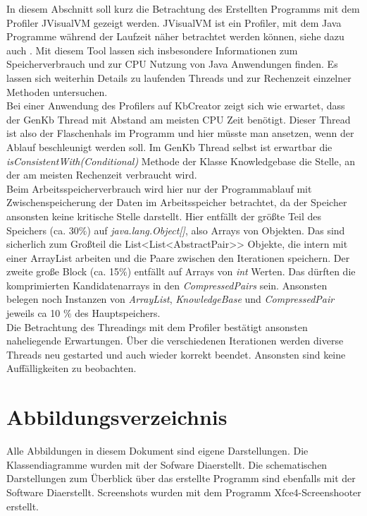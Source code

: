 \documentclass[12pt,a4paper]{article}
\begin{document}
In diesem Abschnitt soll kurz die Betrachtung des Erstellten Programms mit dem Profiler JVisualVM gezeigt werden. JVisualVM ist ein Profiler, mit dem Java Programme während der Laufzeit näher betrachtet werden können, siehe dazu auch \cite{jvis20}. Mit diesem Tool lassen sich insbesondere Informationen zum Speicherverbrauch und zur CPU Nutzung von Java Anwendungen finden. Es lassen sich weiterhin Details zu laufenden Threads und zur Rechenzeit einzelner Methoden untersuchen. \\
Bei einer Anwendung des Profilers auf KbCreator zeigt sich wie erwartet, dass der GenKb Thread mit Abstand am meisten CPU Zeit benötigt. Dieser Thread ist also der Flaschenhals im Programm und hier müsste man ansetzen, wenn der Ablauf beschleunigt werden soll. Im GenKb Thread selbst ist erwartbar die \textit{isConsistentWith(Conditional)} Methode der Klasse Knowledgebase die Stelle, an der am meisten Rechenzeit verbraucht wird. \\
Beim Arbeitsspeicherverbrauch wird hier nur der Programmablauf mit Zwischenspeicherung der Daten im Arbeitsspeicher betrachtet, da der Speicher ansonsten keine kritische Stelle darstellt. Hier entfällt der größte Teil des Speichers (ca. 30$\%$) auf \textit{java.lang.Object[]}, also Arrays von Objekten. Das sind sicherlich zum Großteil die List<List<AbstractPair>> Objekte, die intern mit einer ArrayList arbeiten und die Paare zwischen den Iterationen speichern. Der zweite große Block (ca. 15$\%$) entfällt auf Arrays von \textit{int} Werten. Das dürften die komprimierten Kandidatenarrays in den \textit{CompressedPairs} sein. Ansonsten belegen noch Instanzen von \textit{ArrayList}, \textit{KnowledgeBase} und \textit{CompressedPair} jeweils ca 10 $\%$ des Hauptspeichers. \\
Die Betrachtung des Threadings mit dem Profiler bestätigt ansonsten naheliegende Erwartungen. Über die verschiedenen Iterationen werden diverse Threads neu gestarted und auch wieder korrekt beendet. Ansonsten sind keine Auffälligkeiten zu beobachten.




\newpage

\section*{Abbildungsverzeichnis}
Alle Abbildungen in diesem Dokument sind eigene Darstellungen. Die Klassendiagramme wurden mit der Sofware \glqq Dia\grqq \space erstellt. Die schematischen Darstellungen zum Überblick über das erstellte Programm sind ebenfalls mit der Software \glqq Dia\grqq \space erstellt. Screenshots  wurden mit dem Programm \glqq Xfce4-Screenshooter \grqq \space erstellt.
 
\end{document}
